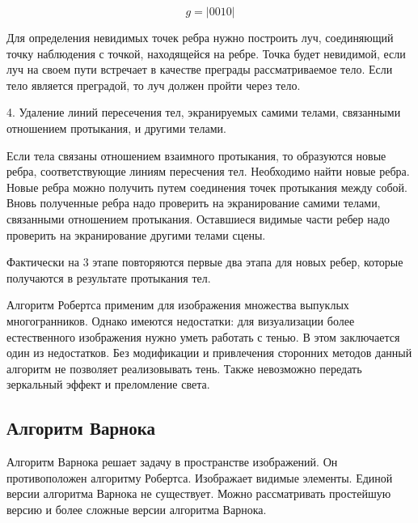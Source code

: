 \begin{equation}
	g = |0010|
	\label{eq:ref3}
\end{equation}

Для определения невидимых точек ребра нужно построить луч, соединяющий точку наблюдения с точкой, находящейся на ребре.
Точка будет невидимой, если луч на своем пути встречает в качестве преграды рассматриваемое тело.
Если тело является преградой, то луч должен пройти через тело.

4. Удаление линий пересечения тел, экранируемых самими телами, связанными отношением протыкания, и другими телами.

Если тела связаны отношением взаимного протыкания, то образуются новые ребра, соответствующие линиям пересчения тел. Необходимо найти новые ребра. Новые ребра можно получить путем соединения точек протыкания между собой. Вновь полученные ребра надо проверить на экранирование самими телами, связанными отношением протыкания. Оставшиеся видимые части ребер надо проверить на экранирование другими телами сцены.

Фактически на 3 этапе повторяются первые два этапа для новых ребер, которые получаются в результате протыкания тел.

Алгоритм Робертса применим для изображения множества выпуклых многогранников. Однако имеются недостатки: для визуализации более естественного изображения нужно уметь работать с тенью. В этом заключается один из недостатков. Без модификации и привлечения сторонних методов данный алгоритм не позволяет реализовывать тень. Также невозможно передать зеркальный эффект и преломление света.

\subsection{Алгоритм Варнока}

Алгоритм Варнока решает задачу в пространстве изображений.
Он противоположен алгоритму Робертса. Изображает видимые элементы.
Единой версии алгоритма Варнока не существует.
Можно рассматривать простейшую версию и более сложные версии алгоритма Варнока.

\begin{figure}[ht!]
\end{figure}

